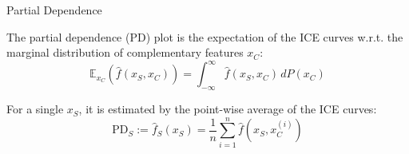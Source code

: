 \documentclass[aspectratio=169]{../latex_main/tntbeamer}  %
\begin{document}
\begin{frame}{Partial Dependence  }

The partial dependence (PD) plot is the expectation of the ICE curves w.r.t. the marginal distribution of complementary features $x_C$:
$$\mathbb{E}_{x_C} \left( \hat{f}(x_S, x_C) \right) = \int_{-\infty}^{\infty} \hat{f}(x_S, x_C) \, dP(x_C)$$

For a single $x_S$, it is estimated by the point-wise average of the ICE curves:
$$\text{PD}_S := \hat{f}_{S}(x_S) = \frac{1}{n} \sum_{i=1}^n \hat{f}(x_S, x_C^{(i)})$$


\end{frame}
\end{document}
